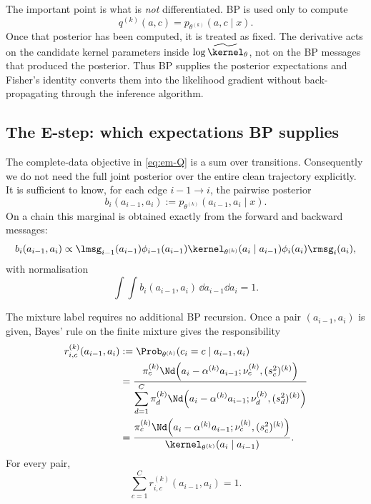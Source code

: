 The important point is what is \emph{not} differentiated. BP is used only to
compute
\[
  q^{(k)}(a,c)
  =
  p_{\theta^{(k)}}(a,c\mid x).
\]
Once that posterior has been computed, it is treated as fixed. The derivative
acts on the candidate kernel parameters inside
$\log\widetilde\kernel_\theta$, not on the BP messages that produced the
posterior. Thus BP supplies the posterior expectations and Fisher's identity
converts them into the likelihood gradient without back-propagating through
the inference algorithm.

\subsection{The E-step: which expectations BP supplies}

The complete-data objective in \eqref{eq:em-Q} is a sum over transitions.
Consequently we do not need the full joint posterior over the entire clean
trajectory explicitly. It is sufficient to know, for each edge
$i-1\to i$, the pairwise posterior
\begin{equation}
  b_i(a_{i-1},a_i)
  :=
  p_{\theta^{(k)}}(a_{i-1},a_i\mid x).
  \label{eq:em-pairwise-def}
\end{equation}
On a chain this marginal is obtained exactly from the forward and backward
messages:
\begin{equation}
  b_i(a_{i-1},a_i)
  \propto
  \lmsg_{i-1}(a_{i-1})
  \phi_{i-1}(a_{i-1})
  \kernel_{\theta^{(k)}}(a_i\mid a_{i-1})
  \phi_i(a_i)
  \rmsg_i(a_i),
  \label{eq:em-pairwise}
\end{equation}
with normalisation
\begin{equation}
  \int\!\!\int
  b_i(a_{i-1},a_i)
  \,\dd a_{i-1}\dd a_i
  =1.
\end{equation}

The mixture label requires no additional BP recursion. Once a pair
$(a_{i-1},a_i)$ is given, Bayes' rule on the finite mixture gives the
responsibility
\begin{align}
  r_{i,c}^{(k)}(a_{i-1},a_i)
  &:=
  \Prob_{\theta^{(k)}}\!
  \left(
    c_i=c
    \mid
    a_{i-1},a_i
  \right)
  \nonumber\\
  &=
  \frac{
    \pi_c^{(k)}
    \Nd\!\left(
      a_i-\alpha^{(k)}a_{i-1};
      \nu_c^{(k)},(s_c^2)^{(k)}
    \right)
  }{
    \displaystyle
    \sum_{d=1}^{C}
    \pi_d^{(k)}
    \Nd\!\left(
      a_i-\alpha^{(k)}a_{i-1};
      \nu_d^{(k)},(s_d^2)^{(k)}
    \right)
  }
  \nonumber\\
  &=
  \frac{
    \pi_c^{(k)}
    \Nd\!\left(
      a_i-\alpha^{(k)}a_{i-1};
      \nu_c^{(k)},(s_c^2)^{(k)}
    \right)
  }{
    \kernel_{\theta^{(k)}}(a_i\mid a_{i-1})
  }.
  \label{eq:em-responsibility}
\end{align}
For every pair,
\begin{equation}
  \sum_{c=1}^{C}
  r_{i,c}^{(k)}(a_{i-1},a_i)
  =1.
\end{equation}

